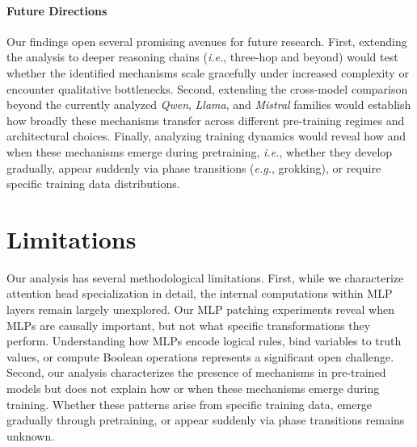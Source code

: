 \documentclass[11pt]{article}
\begin{document}
\paragraph{Future Directions}
Our findings open several promising avenues for future research. First, extending the analysis to deeper reasoning chains (\textit{i.e.}, three-hop and beyond) would test whether the identified mechanisms scale gracefully under increased complexity or encounter qualitative bottlenecks. Second, extending the cross-model comparison beyond the currently analyzed \textit{Qwen}, \textit{Llama}, and \textit{Mistral} families would establish how broadly these mechanisms transfer across different pre-training regimes and architectural choices. 
Finally, analyzing training dynamics would reveal how and when these mechanisms emerge during pretraining, \textit{i.e.}, whether they develop gradually, appear suddenly via phase transitions (\textit{e.g.}, grokking), or require specific training data distributions. 



\section*{Limitations}
Our analysis has several methodological limitations. 
First, while we characterize attention head specialization in detail, the internal computations within MLP layers remain largely unexplored. Our MLP patching experiments reveal when MLPs are causally important, but not what specific transformations they perform. Understanding how MLPs encode logical rules, bind variables to truth values, or compute Boolean operations represents a significant open challenge.
Second, our analysis characterizes the presence of mechanisms in pre-trained models but does not explain how or when these mechanisms emerge during training. Whether these patterns arise from specific training data, emerge gradually through pretraining, or appear suddenly via phase transitions remains unknown.
\end{document}
